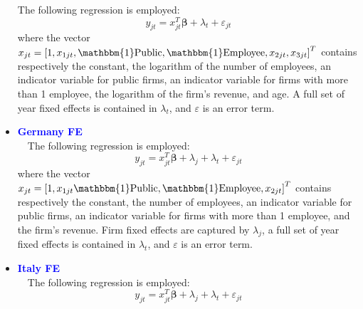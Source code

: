 \documentclass[12pt,notitlepage]{article}
\newcommand{\sym}[1] {\ifmmode^{#1} \else\(^{#1}\) \fi}
\begin{document}
\begin{itemize}
The following regression is employed:
	\begin{equation}
	y_{jt} = x^{T}_{jt}\mathbf{\beta} + \lambda_{t} + \varepsilon_{jt}
	\end{equation}
where the vector $x_{jt} = \left[  1, x_{1jt}, \mathbbm{1}\text{Public}, \mathbbm{1}\text{Employee}, x_{2jt}, x_{3jt}  \right]^{T} $ contains respectively the constant, the logarithm of the number of employees, an indicator variable for public firms, an indicator variable for firms with more than 1 employee, the logarithm of the firm's revenue, and age. A full set of year fixed effects is contained in $\lambda_{t}$, and $\varepsilon$ is an error term.
\begin{table}[htbp]\centering
\def\sym#1{\ifmmode^{#1}\else\(^{#1}\)\fi}
\caption{Haltiwanger growth rate}
\end{table}
\clearpage
\item \textcolor{blue}{\textbf{Germany FE}}\\~\
The following regression is employed:
	\begin{equation}
	y_{jt} = x^{T}_{jt}\mathbf{\beta} + \lambda_{j}  + \lambda_{t} + \varepsilon_{jt}
	\end{equation}
where the vector $x_{jt} = \left[  1, x_{1jt} \mathbbm{1}\text{Public}, \mathbbm{1}\text{Employee}, x_{2jt} \right]^{T} $ contains respectively the constant, the number of employees, an indicator variable for public firms, an indicator variable for firms with more than 1 employee, and the firm's revenue. Firm fixed effects are captured by $\lambda_{j}$, a full set of year fixed effects is contained in $\lambda_{t}$, and $\varepsilon$ is an error term.
\begin{table}[htbp]\centering
\def\sym#1{\ifmmode^{#1}\else\(^{#1}\)\fi}
\caption{Haltiwanger growth rate}
\end{table}
\clearpage
\item \textcolor{blue}{\textbf{Italy FE}}\\~\
The following regression is employed:
	\begin{equation}
	y_{jt} = x^{T}_{jt}\mathbf{\beta} + \lambda_{j}  + \lambda_{t} + \varepsilon_{jt}

\end{equation}
\end{itemize}
\end{document}
